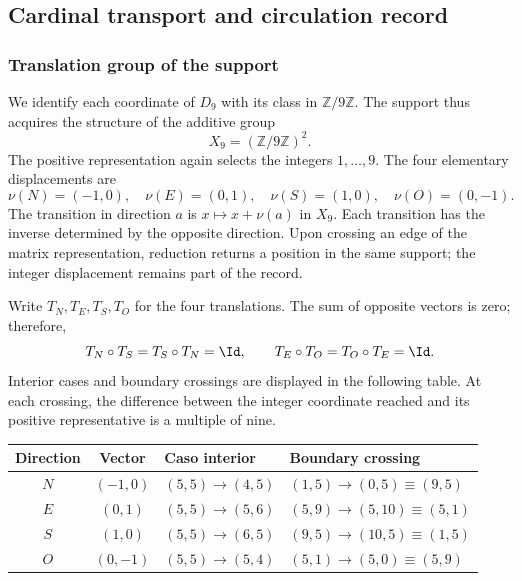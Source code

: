 \subsection{Cardinal transport and circulation record}
\label{sec:app-transporte}

\subsubsection{Translation group of the support}

We identify each coordinate of $D_9$ with its class in $\mathbb Z/9\mathbb Z$. The support thus acquires the structure of the additive group
\[
 X_9=(\mathbb Z/9\mathbb Z)^2.
\]
The positive representation again selects the integers $1,\ldots,9$. The four elementary displacements are
\begin{equation}
 \nu(N)=(-1,0),\quad \nu(E)=(0,1),\quad
 \nu(S)=(1,0),\quad \nu(O)=(0,-1).
\end{equation}
The transition in direction $a$ is $x\mapsto x+\nu(a)$ in $X_9$. Each transition has the inverse determined by the opposite direction. Upon crossing an edge of the matrix representation, reduction returns a position in the same support; the integer displacement remains part of the record.

Write $T_N,T_E,T_S,T_O$ for the four translations. The sum of opposite vectors is zero; therefore,
\[
 T_N\circ T_S=T_S\circ T_N=\Id,
 \qquad T_E\circ T_O=T_O\circ T_E=\Id.
\]
Interior cases and boundary crossings are displayed in the following table. At each crossing, the difference between the integer coordinate reached and its positive representative is a multiple of nine.

\begin{tablacompleta}[htbp]
\caption{Interior transitions and boundary crossings in the matrix representation of APP.}
\label{tab:app-frontera}
\begin{tabular}{ccll}
\toprule
Direction & Vector & Caso interior & Boundary crossing\\
\midrule
$N$ &$(-1,0)$&$(5,5)\to(4,5)$&$(1,5)\to(0,5)\equiv(9,5)$\\
$E$ &$(0,1)$&$(5,5)\to(5,6)$&$(5,9)\to(5,10)\equiv(5,1)$\\
$S$ &$(1,0)$&$(5,5)\to(6,5)$&$(9,5)\to(10,5)\equiv(1,5)$\\
$O$ &$(0,-1)$&$(5,5)\to(5,4)$&$(5,1)\to(5,0)\equiv(5,9)$\\
\bottomrule
\end{tabular}
\end{tablacompleta}

